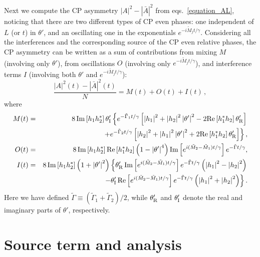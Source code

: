 \documentclass[11pt,a4paper]{article}
\providecommand{\abs}[1]{\left\lvert #1 \right\rvert}
\providecommand{\abss}[1]{\left\lvert #1 \right\rvert^2}
\providecommand{\mire}[1]{{\rm Re} \left[ #1 \right]}
\providecommand{\miim}[1]{{\rm Im} \left[ #1 \right]}
\providecommand{\gmed}[0]{\tilde{\Gamma}}
\providecommand{\treal}[0]{\theta'_{\rm R}}
\providecommand{\tim}[0]{\theta'_{\rm I}}
\providecommand{\pra}[0]{\tilde{M}_1}
\providecommand{\prb}[0]{\tilde{M}_2}
\providecommand{\pia}[0]{\tilde{\Gamma}_1}
\providecommand{\pib}[0]{\tilde{\Gamma}_2}
\begin{document}
Next we compute the CP asymmetry $\abss{A} - \abss{\bar A}$ from eqs.~\eqref{equation_AL}, noticing that there are two different types of CP even phases: one independent of $L$ (or $t$) in $\theta'$, and an oscillating one in the exponentials  $e^{-i  {\tilde M}_j  t/ \gamma}$. Considering all the interferences and the corresponding source of the CP even relative phases, the CP asymmetry can be written as a sum of contributions from mixing $M$ (involving only $\theta'$), from oscillations $O$ (involving only $e^{-i  {\tilde M}_j  t/ \gamma}$), and interference terms $I$ (involving both $\theta'$ and $e^{-i  {\tilde M}_j  t/ \gamma}$):
\begin{equation}
\label{equation_deltaA}
 \frac{\abss{A}(t) - \abss{\bar A}(t)}{N} = M(t) + O(t) + I(t) \, ,
\end{equation}  
where
\begin{eqnarray}
\label{equation_AM}
M(t) &= & 8 \, \miim{h_1 h_2^*} \tim \left\{ e^{-\pia t/\gamma} \left[\abss{h_1} + \abss{h_2} \abss{\theta'} - 2 \mire{h_1^* h_2} \treal \right]  \right. \notag \\ & & \left. +  e^{-\pib t/\gamma} \left[\abss{h_2} + \abss{h_1} \abss{\theta'} + 2 \mire{h_1^* h_2} \treal \right] \right\}, \\
\label{equation_AO}
O(t) & = & 8 \, \miim{h_1 h_2^*} \mire{h_1^* h_2} \left( 1- \abs{\theta'}^4 \right) \miim{e^{i (\prb - \pra) t/\gamma}} e^{-\gmed t/\gamma}, \\ 
\label{equation_AI}
I(t) & = &  8 \, \miim{h_1 h_2^*} \left( 1+\abss{\theta'} \right) \left\{ \treal \,  \miim{e^{i (\prb - \pra) t/\gamma}} e^{-\gmed t/\gamma} \left(\abss{h_1} - \abss{h_2}\right) \right. \notag \\ & & \left. - \tim \, \mire{e^{i (\prb - \pra) t/\gamma}} e^{-\gmed t/\gamma} \left(\abss{h_1} + \abss{h_2}\right)\right\}.
\end{eqnarray}
Here we have defined $\gmed \equiv (\pia+\pib)/2$, while $\treal$ and $\tim$ denote the real and imaginary parts of $\theta'$, respectively.



\section{Source term and analysis}
\label{sec:st}
\end{document}
